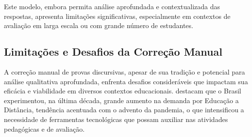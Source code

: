 Este modelo, embora permita análise aprofundada e contextualizada das respostas, apresenta limitações significativas, especialmente em contextos de avaliação em larga escala ou com grande número de estudantes.

\subsection{Limitações e Desafios da Correção Manual}

A correção manual de provas discursivas, apesar de sua tradição e potencial para análise qualitativa aprofundada, enfrenta desafios consideráveis que impactam sua eficácia e viabilidade em diversos contextos educacionais.  destacam que o Brasil experimentou, na última década, grande aumento na demanda por Educação a Distância, tendência acentuada com o advento da pandemia, o que intensificou a necessidade de ferramentas tecnológicas que possam auxiliar nas atividades pedagógicas e de avaliação.

